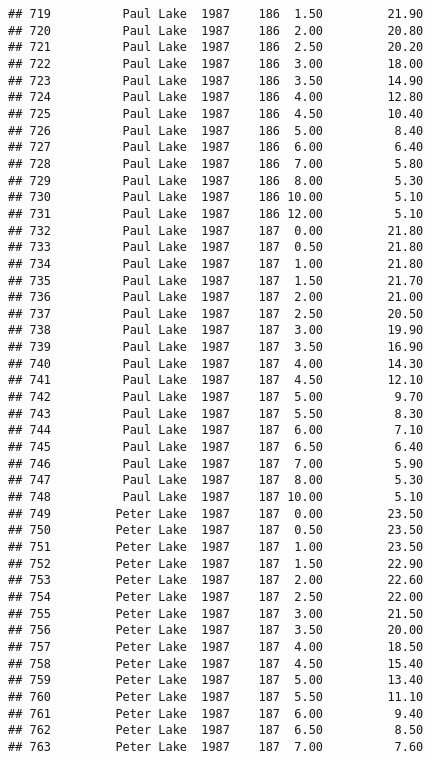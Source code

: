 \documentclass[
]{article}
\begin{document}
\begin{verbatim}
## 719          Paul Lake  1987    186  1.50         21.90
## 720          Paul Lake  1987    186  2.00         20.80
## 721          Paul Lake  1987    186  2.50         20.20
## 722          Paul Lake  1987    186  3.00         18.00
## 723          Paul Lake  1987    186  3.50         14.90
## 724          Paul Lake  1987    186  4.00         12.80
## 725          Paul Lake  1987    186  4.50         10.40
## 726          Paul Lake  1987    186  5.00          8.40
## 727          Paul Lake  1987    186  6.00          6.40
## 728          Paul Lake  1987    186  7.00          5.80
## 729          Paul Lake  1987    186  8.00          5.30
## 730          Paul Lake  1987    186 10.00          5.10
## 731          Paul Lake  1987    186 12.00          5.10
## 732          Paul Lake  1987    187  0.00         21.80
## 733          Paul Lake  1987    187  0.50         21.80
## 734          Paul Lake  1987    187  1.00         21.80
## 735          Paul Lake  1987    187  1.50         21.70
## 736          Paul Lake  1987    187  2.00         21.00
## 737          Paul Lake  1987    187  2.50         20.50
## 738          Paul Lake  1987    187  3.00         19.90
## 739          Paul Lake  1987    187  3.50         16.90
## 740          Paul Lake  1987    187  4.00         14.30
## 741          Paul Lake  1987    187  4.50         12.10
## 742          Paul Lake  1987    187  5.00          9.70
## 743          Paul Lake  1987    187  5.50          8.30
## 744          Paul Lake  1987    187  6.00          7.10
## 745          Paul Lake  1987    187  6.50          6.40
## 746          Paul Lake  1987    187  7.00          5.90
## 747          Paul Lake  1987    187  8.00          5.30
## 748          Paul Lake  1987    187 10.00          5.10
## 749         Peter Lake  1987    187  0.00         23.50
## 750         Peter Lake  1987    187  0.50         23.50
## 751         Peter Lake  1987    187  1.00         23.50
## 752         Peter Lake  1987    187  1.50         22.90
## 753         Peter Lake  1987    187  2.00         22.60
## 754         Peter Lake  1987    187  2.50         22.00
## 755         Peter Lake  1987    187  3.00         21.50
## 756         Peter Lake  1987    187  3.50         20.00
## 757         Peter Lake  1987    187  4.00         18.50
## 758         Peter Lake  1987    187  4.50         15.40
## 759         Peter Lake  1987    187  5.00         13.40
## 760         Peter Lake  1987    187  5.50         11.10
## 761         Peter Lake  1987    187  6.00          9.40
## 762         Peter Lake  1987    187  6.50          8.50
## 763         Peter Lake  1987    187  7.00          7.60

\end{verbatim}
\end{document}
